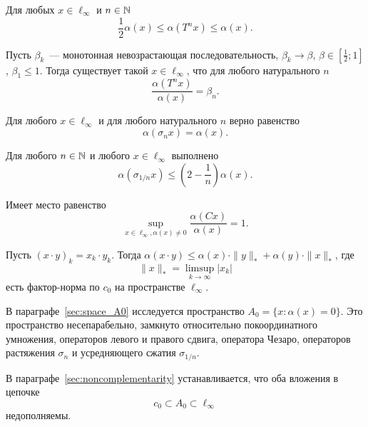 	Для любых $x\in\ell_\infty$ и $n \in \mathbb{N}$
	\begin{equation}\label{est_alpha_Tn_x}
		\frac{1}{2}\alpha(x) \leq \alpha(T^n x) \leq \alpha(x)
		.
	\end{equation}

	Пусть $\beta_k$~--- монотонная невозрастающая последовательность,
	$\beta_k \to \beta$, $\beta\in\left[\frac{1}{2}; 1\right]$, $\beta_1 \leq 1$.
	Тогда существует такой $x\in\ell_\infty$, что для любого натурального $n$
	\begin{equation}
		\frac{\alpha(T^n x)}{\alpha(x)} = \beta_n.
	\end{equation}

	Для любого $x\in\ell_\infty$ и для любого натурального $n$ верно равенство
	\begin{equation}
		\alpha(\sigma_n x) = \alpha(x)
		.
	\end{equation}

	Для любого $n\in\mathbb{N}$ и любого $x\in\ell_\infty$ выполнено
	\begin{equation}
		\alpha(\sigma_{1/n} x) \leq \left( 2- \frac{1}{n} \right) \alpha(x)
		.
	\end{equation}

	Имеет место равенство
	\begin{equation}
		\sup_{x\in\ell_\infty, \alpha(x)\neq 0} \frac{\alpha(Cx)}{\alpha(x)}=1
		.
	\end{equation}

	Пусть $(x\cdot y)_k = x_k\cdot y_k$.
	Тогда
	$\alpha(x\cdot y)\leq \alpha(x)\cdot \|y\|_* + \alpha(y)\cdot \|x\|_*$,
	где
	\begin{equation}
		\|x\|_* = \limsup_{k\to\infty} |x_k|
	\end{equation}
	есть  фактор-норма по $c_0$ на пространстве $\ell_\infty$.

В параграфе~\ref{sec:space_A0} исследуется пространство $A_0 = \{x: \alpha(x) = 0\}$.
Это пространство несепарабельно, замкнуто относительно покоординатного умножения,
операторов левого и правого сдвига, оператора Чезаро,
операторов растяжения $\sigma_n$ и усредняющего сжатия $\sigma_{1/n}$.

В параграфе~\ref{sec:noncomplementarity} устанавливается, что оба вложения в цепочке
\begin{equation}
	c_0 \subset A_0 \subset \ell_\infty
\end{equation}
недополняемы.

